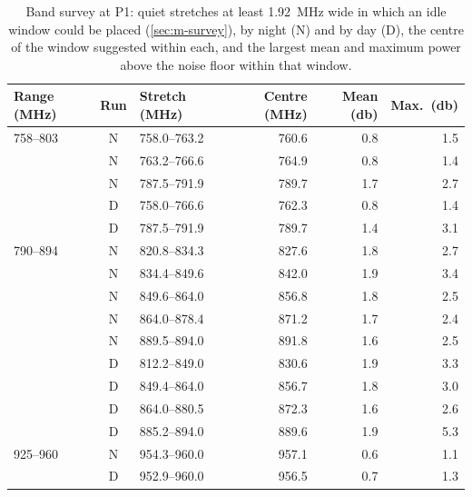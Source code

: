 \begin{table}[tbp]
  \centering
  \small
  \caption[Band survey: quiet stretches]{Band survey at P1: quiet stretches at least \qty{1.92}{\mega\hertz} wide in which an idle window could be placed (\cref{sec:m-survey}), by night (N) and by day (D), the centre of the window suggested within each, and the largest mean and maximum power above the noise floor within that window.}
  \label{tab:app-quiet}
  \begin{tabular}{@{} l c l r r r @{}}
    \toprule
    Range (\unit{\mega\hertz}) & Run & Stretch (\unit{\mega\hertz}) & Centre (\unit{\mega\hertz}) & Mean (\unit{\decibel}) & Max.\ (\unit{\decibel}) \\
    \midrule
    758--803 & N & 758.0--763.2 & 760.6 & 0.8 & 1.5 \\
     & N & 763.2--766.6 & 764.9 & 0.8 & 1.4 \\
     & N & 787.5--791.9 & 789.7 & 1.7 & 2.7 \\
     & D & 758.0--766.6 & 762.3 & 0.8 & 1.4 \\
     & D & 787.5--791.9 & 789.7 & 1.4 & 3.1 \\
    790--894 & N & 820.8--834.3 & 827.6 & 1.8 & 2.7 \\
     & N & 834.4--849.6 & 842.0 & 1.9 & 3.4 \\
     & N & 849.6--864.0 & 856.8 & 1.8 & 2.5 \\
     & N & 864.0--878.4 & 871.2 & 1.7 & 2.4 \\
     & N & 889.5--894.0 & 891.8 & 1.6 & 2.5 \\
     & D & 812.2--849.0 & 830.6 & 1.9 & 3.3 \\
     & D & 849.4--864.0 & 856.7 & 1.8 & 3.0 \\
     & D & 864.0--880.5 & 872.3 & 1.6 & 2.6 \\
     & D & 885.2--894.0 & 889.6 & 1.9 & 5.3 \\
    925--960 & N & 954.3--960.0 & 957.1 & 0.6 & 1.1 \\
     & D & 952.9--960.0 & 956.5 & 0.7 & 1.3 \\
    \bottomrule
  \end{tabular}
\end{table}

